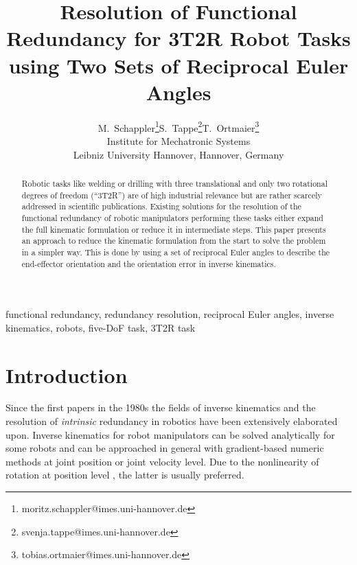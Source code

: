 \documentclass[twocolumn,10pt]{IFTOMM}
\begin{document}
\def\papernumber{IK xxx}
\def\conference_name{15th IFToMM World Congress, Krakow, Poland, 30 June--4 July, 2019}
\title{Resolution of Functional Redundancy for 3T2R Robot Tasks  \\ using Two Sets of Reciprocal Euler Angles}

\author{
    \begin{tabular}{cccc}
    M.\ Schappler\thanks{moritz.schappler@imes.uni-hannover.de}
& S.\ Tappe\thanks{svenja.tappe@imes.uni-hannover.de}
& T.\ Ortmaier\thanks{tobias.ortmaier@imes.uni-hannover.de}\\
    \multicolumn{3}{c}{Institute for Mechatronic Systems} \\
    \multicolumn{3}{c}{Leibniz University Hannover, Hannover, Germany}
    \end{tabular}
}

\maketitle

\begin{abstract}
Robotic tasks like welding or drilling with three translational and only two rotational degrees of freedom (``3T2R'') are of high industrial relevance but are ra\-ther scarcely addressed in scientific publications.
Existing solutions for the resolution of the functional redundancy of robotic manipulators performing these tasks either expand the full kinematic formulation or reduce it in intermediate steps.
This paper presents an approach to reduce the kinematic formulation from the start to solve the problem in a simpler way.
This is done by using a set of reciprocal Euler angles to describe the end-effector orientation and the orientation error in inverse kinematics.
\end{abstract}

\begin{keywords}
functional redundancy, redundancy resolution, reciprocal Euler angles, inverse kinematics, robots, five-DoF task, 3T2R task
\end{keywords}

\section{Introduction}
\label{sec:Intro}
Since the first papers in the 1980s the fields of inverse kinematics \cite{GoldenbergBenFen1985} and the resolution of \emph{intrinsic} redundancy \cite{Yoshikawa1984} in robotics have been extensively elaborated upon.
Inverse kinematics for robot manipulators can be solved analytically for some robots and can be approached in general with gradient-based numeric methods at  joint position or joint velocity level.
Due to the nonlinearity of rotation at position level \cite{GoldenbergBenFen1985}, the latter is usually preferred.
\end{document}
